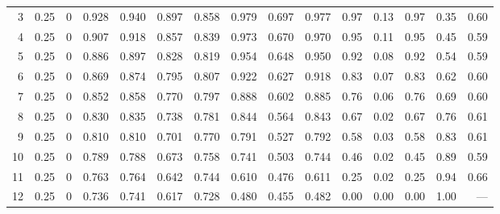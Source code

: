 \begin{landscape}
\begin{longtable}{rrrrrrrrrrrrrrr}
3 & 0.25 & 0 & 0.928 & 0.940 & 0.897 & 0.858 & 0.979 & 0.697 & 0.977 & 0.97 & 0.13 & 0.97 & 0.35 & 0.60 \\
4 & 0.25 & 0 & 0.907 & 0.918 & 0.857 & 0.839 & 0.973 & 0.670 & 0.970 & 0.95 & 0.11 & 0.95 & 0.45 & 0.59 \\
5 & 0.25 & 0 & 0.886 & 0.897 & 0.828 & 0.819 & 0.954 & 0.648 & 0.950 & 0.92 & 0.08 & 0.92 & 0.54 & 0.59 \\
6 & 0.25 & 0 & 0.869 & 0.874 & 0.795 & 0.807 & 0.922 & 0.627 & 0.918 & 0.83 & 0.07 & 0.83 & 0.62 & 0.60 \\
7 & 0.25 & 0 & 0.852 & 0.858 & 0.770 & 0.797 & 0.888 & 0.602 & 0.885 & 0.76 & 0.06 & 0.76 & 0.69 & 0.60 \\
8 & 0.25 & 0 & 0.830 & 0.835 & 0.738 & 0.781 & 0.844 & 0.564 & 0.843 & 0.67 & 0.02 & 0.67 & 0.76 & 0.61 \\
9 & 0.25 & 0 & 0.810 & 0.810 & 0.701 & 0.770 & 0.791 & 0.527 & 0.792 & 0.58 & 0.03 & 0.58 & 0.83 & 0.61 \\
10 & 0.25 & 0 & 0.789 & 0.788 & 0.673 & 0.758 & 0.741 & 0.503 & 0.744 & 0.46 & 0.02 & 0.45 & 0.89 & 0.59 \\
11 & 0.25 & 0 & 0.763 & 0.764 & 0.642 & 0.744 & 0.610 & 0.476 & 0.611 & 0.25 & 0.02 & 0.25 & 0.94 & 0.66 \\
12 & 0.25 & 0 & 0.736 & 0.741 & 0.617 & 0.728 & 0.480 & 0.455 & 0.482 & 0.00 & 0.00 & 0.00 & 1.00 & --- \\
\end{longtable}
\end{landscape}
